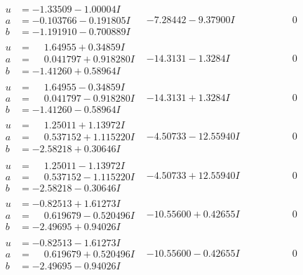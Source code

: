 \documentclass[1p]{elsarticle_modified}
\theoremstyle{definition}
\begin{document}
$$\begin{array}{c|c|c}
\begin{aligned}
u &= -1.33509 - 1.00004 I \\
a &= -0.103766 - 0.191805 I \\
b &= -1.191910 - 0.700889 I\end{aligned}
 & -7.28442 - 9.37900 I & \phantom{-0.000000 } 0 \\ \hline\begin{aligned}
u &= \phantom{-}1.64955 + 0.34859 I \\
a &= \phantom{-}0.041797 + 0.918280 I \\
b &= -1.41260 + 0.58964 I\end{aligned}
 & -14.3131 - 1.3284 I & \phantom{-0.000000 } 0 \\ \hline\begin{aligned}
u &= \phantom{-}1.64955 - 0.34859 I \\
a &= \phantom{-}0.041797 - 0.918280 I \\
b &= -1.41260 - 0.58964 I\end{aligned}
 & -14.3131 + 1.3284 I & \phantom{-0.000000 } 0 \\ \hline\begin{aligned}
u &= \phantom{-}1.25011 + 1.13972 I \\
a &= \phantom{-}0.537152 + 1.115220 I \\
b &= -2.58218 + 0.30646 I\end{aligned}
 & -4.50733 - 12.55940 I & \phantom{-0.000000 } 0 \\ \hline\begin{aligned}
u &= \phantom{-}1.25011 - 1.13972 I \\
a &= \phantom{-}0.537152 - 1.115220 I \\
b &= -2.58218 - 0.30646 I\end{aligned}
 & -4.50733 + 12.55940 I & \phantom{-0.000000 } 0 \\ \hline\begin{aligned}
u &= -0.82513 + 1.61273 I \\
a &= \phantom{-}0.619679 - 0.520496 I \\
b &= -2.49695 + 0.94026 I\end{aligned}
 & -10.55600 + 0.42655 I & \phantom{-0.000000 } 0 \\ \hline\begin{aligned}
u &= -0.82513 - 1.61273 I \\
a &= \phantom{-}0.619679 + 0.520496 I \\
b &= -2.49695 - 0.94026 I\end{aligned}
 & -10.55600 - 0.42655 I & \phantom{-0.000000 } 0 \\ \hline\begin{aligned}

\end{aligned}
\end{array}$$
\end{document}
